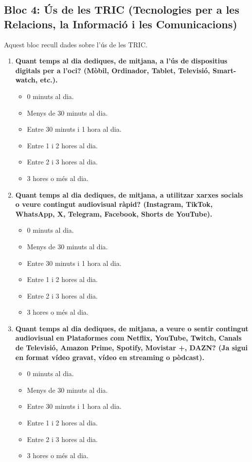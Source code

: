 \documentclass[12pt]{article}
\newcommand{\subsectiononumber}[1]{%
  \subsection*{#1}
  \phantomsection
}
\begin{document}
\subsectiononumber{Bloc 4: Ús de les TRIC (Tecnologies per a les Relacions, la Informació i les Comunicacions)}
Aquest bloc recull dades sobre l'ús de les TRIC.

\begin{enumerate}
    \item \textbf{Quant temps al dia dediques, de mitjana, a l'ús de dispositius digitals per a l'oci? (Mòbil, Ordinador, Tablet, Televisió, Smart-watch, etc.).}
    \begin{itemize}
        \item[$\square$] 0 minuts al dia.
        \item[$\square$] Menys de 30 minuts al dia.
        \item[$\square$] Entre 30 minuts i 1 hora al dia.
        \item[$\square$] Entre 1 i 2 hores al dia.
        \item[$\square$] Entre 2 i 3 hores al dia.
        \item[$\square$] 3 hores o més al dia.
    \end{itemize}

    \item \textbf{Quant temps al dia dediques, de mitjana, a utilitzar xarxes socials o veure contingut audiovisual ràpid? (Instagram, TikTok, WhatsApp, X, Telegram, Facebook, Shorts de YouTube).}
    \begin{itemize}
        \item[$\square$] 0 minuts al dia.
        \item[$\square$] Menys de 30 minuts al dia.
        \item[$\square$] Entre 30 minuts i 1 hora al dia.
        \item[$\square$] Entre 1 i 2 hores al dia.
        \item[$\square$] Entre 2 i 3 hores al dia.
        \item[$\square$] 3 hores o més al dia.
    \end{itemize}

    \item \textbf{Quant temps al dia dediques, de mitjana, a veure o sentir contingut audiovisual en Plataformes com Netflix, YouTube, Twitch, Canals de Televisió, Amazon Prime, Spotify, Movistar +, DAZN? (Ja sigui en format vídeo gravat, vídeo en streaming o pòdcast).}
    \begin{itemize}
        \item[$\square$] 0 minuts al dia.
        \item[$\square$] Menys de 30 minuts al dia.
        \item[$\square$] Entre 30 minuts i 1 hora al dia.
        \item[$\square$] Entre 1 i 2 hores al dia.
        \item[$\square$] Entre 2 i 3 hores al dia.
        \item[$\square$] 3 hores o més al dia.
    \end{itemize}


\end{enumerate}
\end{document}
